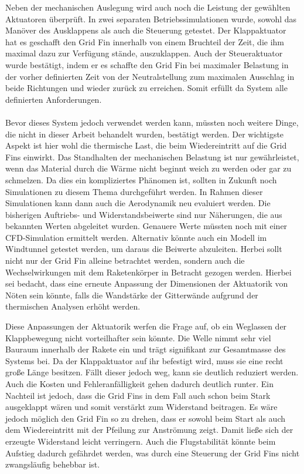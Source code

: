 Neben der mechanischen Auslegung wird auch noch die Leistung der gewählten Aktuatoren überprüft. In zwei separaten Betriebssimulationen wurde, sowohl das Manöver des Ausklappens als auch die Steuerung getestet. Der Klappaktuator hat es geschafft den Grid Fin innerhalb von einem Bruchteil der Zeit, die ihm maximal dazu zur Verfügung stände, auszuklappen. Auch der Steueraktuator wurde bestätigt, indem er es schaffte den Grid Fin bei maximaler Belastung in der vorher definierten Zeit von der Neutralstellung zum maximalen Ausschlag in beide Richtungen und wieder zurück  zu erreichen. Somit erfüllt da System alle definierten Anforderungen.
\\~\\
Bevor dieses System jedoch verwendet werden kann, müssten noch weitere Dinge, die nicht in dieser Arbeit behandelt wurden, bestätigt werden. Der wichtigste Aspekt ist hier wohl die thermische Last, die beim Wiedereintritt auf die Grid Fins einwirkt. Das Standhalten der mechanischen Belastung ist nur gewährleistet, wenn das Material durch die Wärme nicht beginnt weich zu werden oder gar zu schmelzen. Da dies ein kompliziertes Phänomen ist, sollten in Zukunft noch Simulationen zu diesem Thema durchgeführt werden. In Rahmen dieser Simulationen kann dann auch die Aerodynamik neu evaluiert werden. Die bisherigen Auftriebs- und Widerstandsbeiwerte sind nur Näherungen, die aus bekannten Werten abgeleitet wurden. Genauere Werte müssten noch mit einer CFD-Simulation ermittelt werden. Alternativ könnte auch ein Modell im Windtunnel getestet werden, um daraus die Beiwerte abzuleiten. Herbei sollt nicht nur der Grid Fin alleine betrachtet werden, sondern auch die Wechselwirkungen mit dem Raketenkörper in Betracht gezogen werden. Hierbei sei bedacht, dass eine erneute Anpassung der Dimensionen der  Aktuatorik von Nöten sein könnte, falls die Wandstärke der Gitterwände aufgrund der thermischen Analysen erhöht werden.

Diese Anpassungen der Aktuatorik werfen die Frage auf, ob ein Weglassen der Klappbewegung nicht vorteilhafter sein könnte. Die Welle nimmt sehr viel Bauraum innerhalb der Rakete ein und trägt signifikant zur Gesamtmasse des Systems bei. Da der Klappaktuator auf ihr befestigt wird, muss sie eine recht große Länge besitzen. Fällt dieser jedoch weg, kann sie deutlich reduziert werden. Auch die Kosten und Fehleranfälligkeit gehen dadurch deutlich runter. Ein Nachteil ist jedoch, dass die Grid Fins in dem Fall auch schon beim Stark ausgeklappt wären und somit verstärkt zum Widerstand beitragen. Es wäre jedoch möglich den Grid Fin so zu drehen, dass er sowohl beim Start als auch dem Wiedereintritt mit der Pfeilung zur Anströmung zeigt. Damit ließe sich der erzeugte Widerstand leicht verringern. Auch die Flugstabilität könnte beim Aufstieg dadurch gefährdet werden, was durch eine Steuerung der Grid Fins nicht zwangsläufig behebbar ist.

